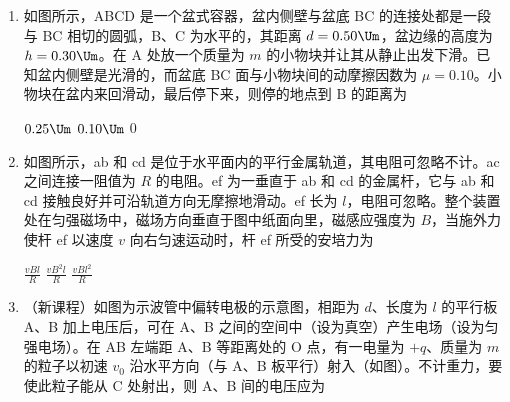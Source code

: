\documentclass[\gkver]{gaokaozhenti}
\begin{document}
\begin{enumerate}
\item
如图所示，ABCD 是一个盆式容器，盆内侧壁与盆底 BC 的连接处都是一段与 BC 相切的圆弧，B、C 为水平的，其距离 $d=0.50\Um$，盆边缘的高度为 $h=0.30\Um$。在 A 处放一个质量为 $m$ 的小物块并让其从静止出发下滑。已知盆内侧壁是光滑的，而盆底 BC 面与小物块间的动摩擦因数为 $\mu=0.10$。小物块在盆内来回滑动，最后停下来，则停的地点到 B 的距离为


\fourchoices[answer=D]
{$0.50\Um$}
{$0.25\Um$}
{$0.10\Um$}
{$0$}


\item
如图所示，ab 和 cd 是位于水平面内的平行金属轨道，其电阻可忽略不计。ac 之间连接一阻值为 $R$ 的电阻。ef 为一垂直于 ab 和 cd 的金属杆，它与 ab 和 cd 接触良好并可沿轨道方向无摩擦地滑动。ef 长为 $l$，电阻可忽略。整个装置处在匀强磁场中，磁场方向垂直于图中纸面向里，磁感应强度为 $B$，当施外力使杆 ef 以速度 $v$ 向右匀速运动时，杆 ef 所受的安培力为


{$\frac{vBl}{R}$}
{$\frac{vB^2l}{R}$}
{$\frac{vBl^2}{R}$}


\item
（新课程）如图为示波管中偏转电极的示意图，相距为 $d$、长度为 $l$ 的平行板 A、B 加上电压后，可在 A、B 之间的空间中（设为真空）产生电场（设为匀强电场）。在 AB 左端距 A、B 等距离处的 O 点，有一电量为 $+q$、质量为 $m$ 的粒子以初速 $v_{0}$ 沿水平方向（与 A、B 板平行）射入（如图）。不计重力，要使此粒子能从 C 处射出，则 A、B 间的电压应为



\end{enumerate}
\end{document}
